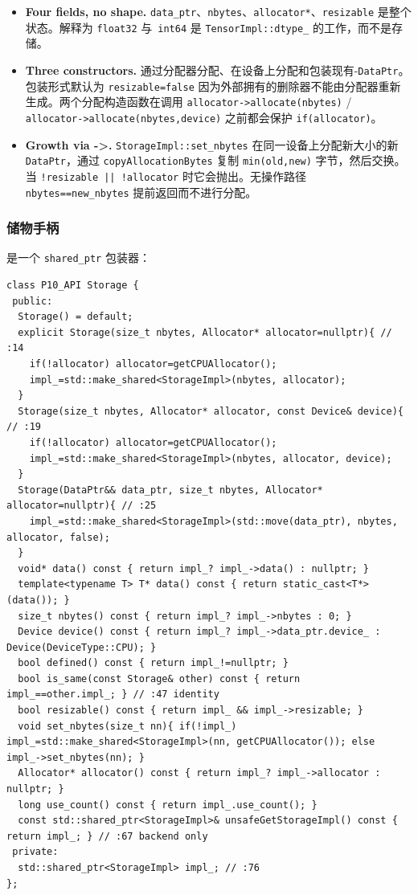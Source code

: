 \begin{itemize}[leftmargin=1.2em]
\item \textbf{Four fields, no shape.} \texttt{data\_ptr}、\texttt{nbytes}、\texttt{allocator*}、\texttt{resizable} 是整个状态。解释为 \texttt{float32} 与\ \texttt{int64} 是 \texttt{TensorImpl::dtype\_} 的工作，而不是存储。
\item \textbf{Three constructors.} 通过分配器分配、在设备上分配和包装现有-\texttt{DataPtr}。包装形式默认为 \texttt{resizable=false} 因为外部拥有的删除器不能由分配器重新生成。两个分配构造函数在调用 \texttt{allocator->allocate(nbytes)} / \texttt{allocator->allocate(nbytes,device)} 之前都会保护 \texttt{if(allocator)}。
\item \textbf{Growth via ->.} \texttt{StorageImpl::set\_nbytes} 在同一设备上分配新大小的新 \texttt{DataPtr}，通过 \texttt{copyAllocationBytes} 复制 \texttt{min(old,new)} 字节，然后交换。当 \texttt{!resizable || !allocator} 时它会抛出。无操作路径 \texttt{nbytes==new\_nbytes} 提前返回而不进行分配。
\end{itemize}

\subsubsection{储物手柄}

是一个 \texttt{shared\_ptr} 包装器：

\begin{lstlisting}[caption={ref-counted handle.}, label=lst:storagehandle]
class P10_API Storage {
 public:
  Storage() = default;
  explicit Storage(size_t nbytes, Allocator* allocator=nullptr){ // :14
    if(!allocator) allocator=getCPUAllocator();
    impl_=std::make_shared<StorageImpl>(nbytes, allocator);
  }
  Storage(size_t nbytes, Allocator* allocator, const Device& device){ // :19
    if(!allocator) allocator=getCPUAllocator();
    impl_=std::make_shared<StorageImpl>(nbytes, allocator, device);
  }
  Storage(DataPtr&& data_ptr, size_t nbytes, Allocator* allocator=nullptr){ // :25
    impl_=std::make_shared<StorageImpl>(std::move(data_ptr), nbytes, allocator, false);
  }
  void* data() const { return impl_? impl_->data() : nullptr; }
  template<typename T> T* data() const { return static_cast<T*>(data()); }
  size_t nbytes() const { return impl_? impl_->nbytes : 0; }
  Device device() const { return impl_? impl_->data_ptr.device_ : Device(DeviceType::CPU); }
  bool defined() const { return impl_!=nullptr; }
  bool is_same(const Storage& other) const { return impl_==other.impl_; } // :47 identity
  bool resizable() const { return impl_ && impl_->resizable; }
  void set_nbytes(size_t nn){ if(!impl_) impl_=std::make_shared<StorageImpl>(nn, getCPUAllocator()); else impl_->set_nbytes(nn); }
  Allocator* allocator() const { return impl_? impl_->allocator : nullptr; }
  long use_count() const { return impl_.use_count(); }
  const std::shared_ptr<StorageImpl>& unsafeGetStorageImpl() const { return impl_; } // :67 backend only
 private:
  std::shared_ptr<StorageImpl> impl_; // :76
};
\end{lstlisting}

